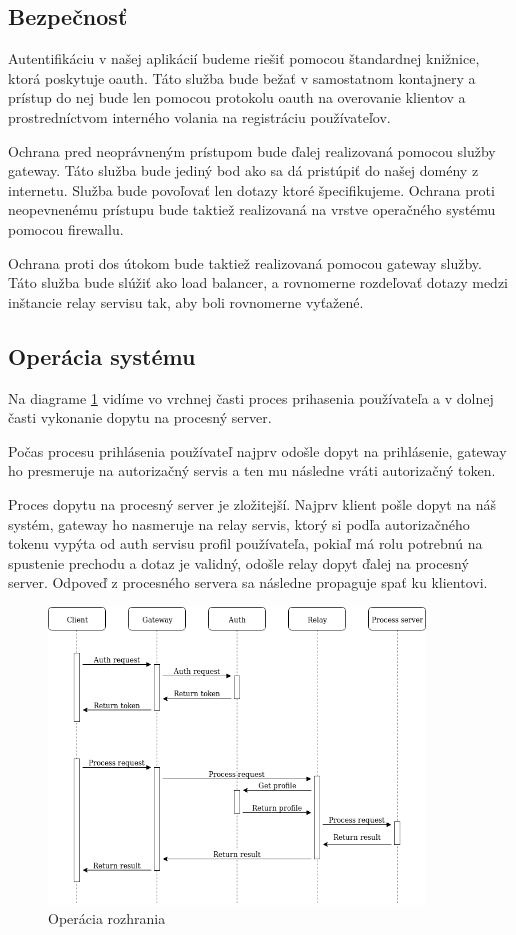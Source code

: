 \subsection{Bezpečnosť}

Autentifikáciu v našej aplikácií budeme riešiť pomocou štandardnej knižnice, ktorá poskytuje \acrshort{oauth}. Táto služba bude bežať v samostatnom kontajnery a prístup do nej bude len pomocou protokolu \acrshort{oauth} na overovanie klientov a prostredníctvom interného volania na registráciu používateľov.

Ochrana pred neoprávneným prístupom bude ďalej realizovaná pomocou služby gateway. Táto služba bude jediný bod ako sa dá pristúpiť do našej domény z internetu. Služba bude povoľovať len dotazy ktoré špecifikujeme. Ochrana proti neopevnenému prístupu bude taktiež realizovaná na vrstve operačného systému pomocou firewallu.

Ochrana proti \acrshort{dos} útokom bude taktiež realizovaná pomocou gateway služby. Táto služba bude slúžiť ako load balancer, a rovnomerne rozdeľovať dotazy medzi inštancie relay servisu tak, aby boli rovnomerne vyťažené.

\subsection{Operácia systému}
Na diagrame \ref{api_operation} vidíme vo vrchnej časti proces prihasenia používateľa a v dolnej časti vykonanie dopytu na procesný server.

Počas procesu prihlásenia používateľ najprv odošle dopyt na prihlásenie, gateway ho presmeruje na autorizačný servis a ten mu následne vráti autorizačný token.

Proces dopytu na procesný server je zložitejší. Najprv klient pošle dopyt na náš systém, gateway ho nasmeruje na relay servis, ktorý si podľa autorizačného tokenu vypýta od auth servisu profil používateľa, pokiaľ má rolu potrebnú na spustenie prechodu a dotaz je validný, odošle relay dopyt ďalej na procesný server. Odpoveď z procesného servera sa následne propaguje spať ku klientovi.

\begin{figure}[!htbp]
	\centering
	\includegraphics[width=10cm]{img/api_operation.png}
	\caption{Operácia rozhrania}
	\label{api_operation}
\end{figure}

